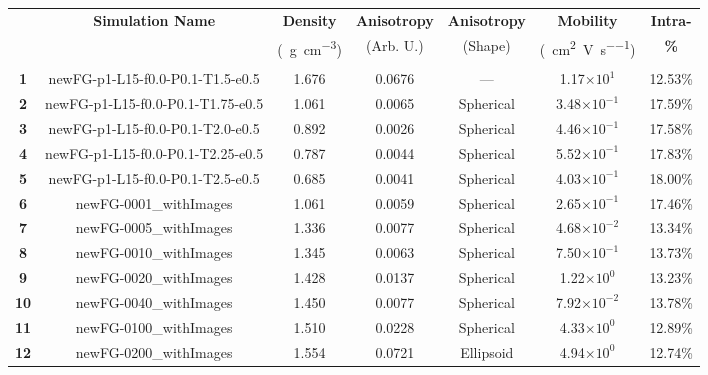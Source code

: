 \documentclass[12pt]{article}
\def\mobunits{\square\centi\meter\per\volt\per\second}
\def\gcm{\gram\per\cubic\centi\meter}
\def\ccg{\cellcolor{gray}}
\begin{document}
\begin{center}
\begin{adjustbox}{max width=\textwidth}
\begin{tabular}{| c | c | c | c | c | c | c |}
\hline
\rule{0pt}{2.5ex} 
\multirow{2}{*}{\textbf{ID}}&\multirow{2}{*}{\textbf{Simulation Name}}&\textbf{Density}&\textbf{Anisotropy}&\textbf{Anisotropy}&\textbf{Mobility}&\textbf{Intra-}\\
                            &&(\SI{}{\gcm})&(Arb. U.)&(Shape)&(\SI{}{\mobunits})&\textbf{\%}\\
\hhline{|=======|}
\multicolumn{7}{| c |}{{\ccg}NewFG Runs}\\
\hhline{|=======|}
\textbf{1}&\rule{0pt}{2.5ex}newFG-p1-L15-f0.0-P0.1-T1.5-e0.5&1.676&0.0676&---&1.17$\times 10^{1}$&12.53\%\\
{\ccg}\textbf{2}&{\ccg}\rule{0pt}{2.5ex}newFG-p1-L15-f0.0-P0.1-T1.75-e0.5&{\ccg}1.061&{\ccg}0.0065&{\ccg}Spherical&{\ccg}3.48$\times 10^{-1}$&{\ccg}17.59\%\\
\textbf{3}&\rule{0pt}{2.5ex}newFG-p1-L15-f0.0-P0.1-T2.0-e0.5&0.892&0.0026&Spherical&4.46$\times 10^{-1}$&17.58\%\\
{\ccg}\textbf{4}&{\ccg}\rule{0pt}{2.5ex}newFG-p1-L15-f0.0-P0.1-T2.25-e0.5&{\ccg}0.787&{\ccg}0.0044&{\ccg}Spherical&{\ccg}5.52$\times 10^{-1}$&{\ccg}17.83\%\\
\textbf{5}&\rule{0pt}{2.5ex}newFG-p1-L15-f0.0-P0.1-T2.5-e0.5&0.685&0.0041&Spherical&4.03$\times 10^{-1}$&18.00\%\\
\hhline{|=======|}
{\ccg}\textbf{6}&{\ccg}\rule{0pt}{2.5ex}newFG-0001\_withImages&{\ccg}1.061&{\ccg}0.0059&{\ccg}Spherical&{\ccg}2.65$\times 10^{-1}$&{\ccg}17.46\%\\
\textbf{7}&\rule{0pt}{2.5ex}newFG-0005\_withImages&1.336&0.0077&Spherical&4.68$\times 10^{-2}$&13.34\%\\
{\ccg}\textbf{8}&{\ccg}\rule{0pt}{2.5ex}newFG-0010\_withImages&{\ccg}1.345&{\ccg}0.0063&{\ccg}Spherical&{\ccg}7.50$\times 10^{-1}$&{\ccg}13.73\%\\
\textbf{9}&\rule{0pt}{2.5ex}newFG-0020\_withImages&1.428&0.0137&Spherical&1.22$\times 10^{0}$&13.23\%\\
{\ccg}\textbf{10}&{\ccg}\rule{0pt}{2.5ex}newFG-0040\_withImages&{\ccg}1.450&{\ccg}0.0077&{\ccg}Spherical&{\ccg}7.92$\times 10^{-2}$&{\ccg}13.78\%\\
\textbf{11}&\rule{0pt}{2.5ex}newFG-0100\_withImages&1.510&0.0228&Spherical&4.33$\times 10^{0}$&12.89\%\\
{\ccg}\textbf{12}&{\ccg}\rule{0pt}{2.5ex}newFG-0200\_withImages&{\ccg}1.554&{\ccg}0.0721&{\ccg}Ellipsoid&{\ccg}4.94$\times 10^{0}$&{\ccg}12.74\%\\

\end{tabular}
\end{adjustbox}
\end{center}
\end{document}
